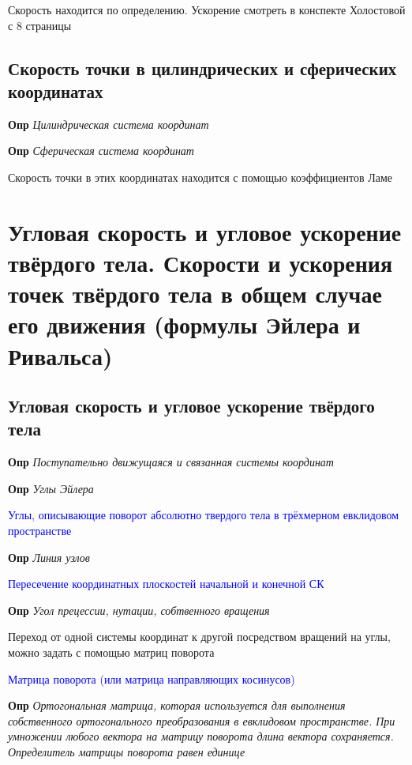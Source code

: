 \documentclass[a4paper, 14pt]{article}
\begin{document}
    Скорость находится по определению.
    Ускорение смотреть в конспекте Холостовой с 8 страницы
    
    \subsection{Скорость точки в цилиндрических и сферических координатах}
    
    \textbf{Опр} \textit{Цилиндрическая система координат}
    
    \textbf{Опр} \textit{Сферическая система координат}
    
    Скорость точки в этих координатах находится с помощью коэффициентов Ламе
    
    \section{Угловая скорость и угловое ускорение твёрдого тела.
    Скорости и ускорения точек твёрдого тела в общем случае его движения (формулы Эйлера и Ривальса)}
    
    \subsection{Угловая скорость и угловое ускорение твёрдого тела}
    
    \textbf{Опр} \textit{Поступательно движущаяся и связанная системы координат}
    
    \textbf{Опр} \textit{Углы Эйлера}
    
    \textcolor{blue}{Углы, описывающие поворот абсолютно твердого тела в трёхмерном евклидовом пространстве}
    
    \textbf{Опр} \textit{Линия узлов}
    
    \textcolor{blue}{Пересечение координатных плоскостей начальной и конечной СК}
    
    \textbf{Опр} \textit{Угол прецессии, нутации, собтвенного вращения}
    
    Переход от одной системы координат к другой посредством вращений на углы, можно задать с помощью матриц поворота
    
    \textcolor{blue}{Матрица поворота (или матрица направляющих косинусов)}
    
    \textbf{Опр} \textit{Ортогональная матрица, которая используется для выполнения собственного ортогонального
    преобразования в евклидовом пространстве.
    При умножении любого вектора на матрицу поворота длина вектора сохраняется.
    Определитель матрицы поворота равен единице}
    
\end{document}
